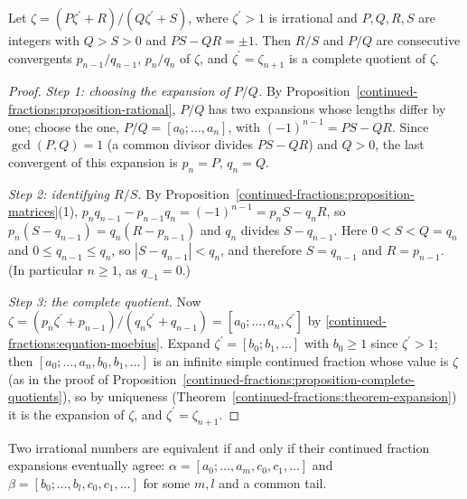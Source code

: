 \begin{lemma}\label{continued-fractions:lemma-serret}
Let $\zeta = (P\zeta^{\prime} + R)/(Q\zeta^{\prime} + S)$, where $\zeta^{\prime} > 1$ is irrational and $P, Q, R, S$ are integers with $Q > S > 0$ and $PS - QR = \pm 1$. Then $R/S$ and $P/Q$ are
consecutive convergents $p_{n-1}/q_{n-1}$, $p_n/q_n$ of $\zeta$, and $\zeta^{\prime} = \zeta_{n+1}$ is a complete quotient of $\zeta$.
\end{lemma}

\begin{proof}
\emph{Step 1: choosing the expansion of $P/Q$.} By Proposition~\ref{continued-fractions:proposition-rational}, $P/Q$ has two expansions whose lengths differ by one; choose the one,
$P/Q = [a_0; \ldots, a_n]$, with $(-1)^{n-1} = PS - QR$. Since $\gcd(P, Q) = 1$ (a common divisor divides $PS - QR$) and $Q > 0$, the last convergent of this expansion is $p_n = P$, $q_n = Q$.

\emph{Step 2: identifying $R/S$.} By Proposition~\ref{continued-fractions:proposition-matrices}(1), $p_nq_{n-1} - p_{n-1}q_n = (-1)^{n-1} = p_nS - q_nR$, so $p_n(S - q_{n-1}) = q_n(R - p_{n-1})$ and
$q_n$ divides $S - q_{n-1}$. Here $0 < S < Q = q_n$ and $0 \leq q_{n-1} \leq q_n$, so $|S - q_{n-1}| < q_n$, and therefore $S = q_{n-1}$ and $R = p_{n-1}$. (In particular $n \geq 1$, as $q_{-1} = 0$.)

\emph{Step 3: the complete quotient.} Now $\zeta = (p_n\zeta^{\prime} + p_{n-1})/(q_n\zeta^{\prime} + q_{n-1}) = [a_0; \ldots, a_n, \zeta^{\prime}]$ by \eqref{continued-fractions:equation-moebius}.
Expand $\zeta^{\prime} = [b_0; b_1, \ldots]$ with $b_0 \geq 1$ since $\zeta^{\prime} > 1$; then $[a_0; \ldots, a_n, b_0, b_1, \ldots]$ is an infinite simple continued fraction whose value is $\zeta$
(as in the proof of Proposition~\ref{continued-fractions:proposition-complete-quotients}), so by uniqueness (Theorem~\ref{continued-fractions:theorem-expansion}) it is the expansion of $\zeta$, and
$\zeta^{\prime} = \zeta_{n+1}$.
\end{proof}

\begin{theorem}[Serret]\label{continued-fractions:theorem-serret}
Two irrational numbers are equivalent if and only if their continued fraction expansions eventually agree: $\alpha = [a_0; \ldots, a_m, c_0, c_1, \ldots]$ and
$\beta = [b_0; \ldots, b_l, c_0, c_1, \ldots]$ for some $m, l$ and a common tail.
\end{theorem}

